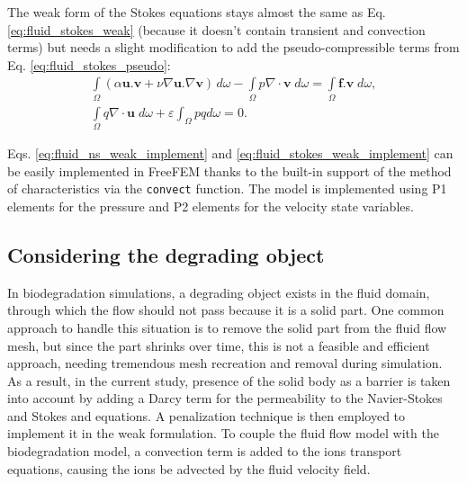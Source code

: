 The weak form of the Stokes equations stays almost the same as Eq. \ref{eq:fluid_stokes_weak} (because it doesn't contain transient and convection terms) but needs a slight modification to add the pseudo-compressible terms from Eq. \ref{eq:fluid_stokes_pseudo}:
\begin{equation} \label{eq:fluid_stokes_weak_implement}
\begin{array}{*{20}{l}}
\displaystyle  {\int\limits_\Omega  {(\alpha {\mathbf{u}}.{\mathbf{v}} + \nu\nabla {\mathbf{u}}.\nabla {\mathbf{v}})\,} d\omega  - \int\limits_\Omega  {p\nabla\cdot{\mathbf{v}}\;d\omega  = } \int\limits_\Omega  {{\mathbf{f}}.{\mathbf{v}}\;d\omega,} } \\ 
\displaystyle  {\int\limits_\Omega  {q\nabla\cdot{\mathbf{u}}\;d\omega +\varepsilon \int_{\Omega} p q d \omega  = 0}.} 
\end{array}
\end{equation}

Eqs. \ref{eq:fluid_ns_weak_implement} and \ref{eq:fluid_stokes_weak_implement} can be easily implemented in FreeFEM thanks to the built-in support of the method of characteristics via the \verb|convect| function. The model is implemented using P1 elements for the pressure and P2 elements for the velocity state variables.

\subsection{Considering the degrading object}

In biodegradation simulations, a degrading object exists in the fluid domain, through which the flow should not pass because it is a solid part. One common approach to handle this situation is to remove the solid part from the fluid flow mesh, but since the part shrinks over time, this is not a feasible and efficient approach, needing tremendous mesh recreation and removal during simulation. As a result, in the current study, presence of the solid body as a barrier is taken into account by adding a Darcy term for the permeability to the Navier-Stokes and Stokes and equations. A penalization technique is then employed to implement it in the weak formulation. To couple the fluid flow model with the biodegradation model, a convection term is added to the ions transport equations, causing the ions be advected by the fluid velocity field.

